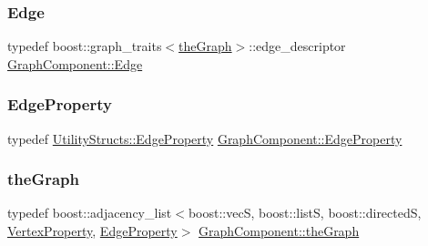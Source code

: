 \mbox{\label{class_graph_component_aa7517b2af08aa717324076a645c73fe6}} 
\subsubsection{\texorpdfstring{Edge}{Edge}}
{\footnotesize\ttfamily typedef boost\+::graph\+\_\+traits$<$\hyperlink{class_graph_component_a982e0748a6e1b8dc74986f5f8b3dca5c}{the\+Graph}$>$\+::edge\+\_\+descriptor \hyperlink{class_graph_component_aa7517b2af08aa717324076a645c73fe6}{Graph\+Component\+::\+Edge}}

\mbox{\label{class_graph_component_ae2f6ef4a3ac656d8213df42aa3d4c3b3}} 
\subsubsection{\texorpdfstring{Edge\+Property}{EdgeProperty}}
{\footnotesize\ttfamily typedef \hyperlink{struct_utility_structs_1_1_edge_property}{Utility\+Structs\+::\+Edge\+Property} \hyperlink{class_graph_component_ae2f6ef4a3ac656d8213df42aa3d4c3b3}{Graph\+Component\+::\+Edge\+Property}}

\mbox{\label{class_graph_component_a982e0748a6e1b8dc74986f5f8b3dca5c}} 
\subsubsection{\texorpdfstring{the\+Graph}{theGraph}}
{\footnotesize\ttfamily typedef boost\+::adjacency\+\_\+list$<$boost\+::vecS, boost\+::listS, boost\+::directedS, \hyperlink{class_graph_component_a7c0fcb3f03bf188b7df520e0cdd364b7}{Vertex\+Property}, \hyperlink{class_graph_component_ae2f6ef4a3ac656d8213df42aa3d4c3b3}{Edge\+Property}$>$ \hyperlink{class_graph_component_a982e0748a6e1b8dc74986f5f8b3dca5c}{Graph\+Component\+::the\+Graph}}

\mbox{\label{class_graph_component_ad40772702161324303e24463a63738e9}} 
